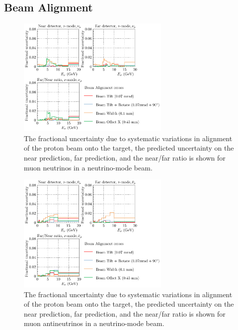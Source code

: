 \documentclass{article}
\begin{document}
\subsection{Beam Alignment}

\begin{figure}
  \centering
  \includegraphics[width=0.65\textwidth]{plots/fracerrs/numode_numu_BeamAlignment}
  \caption{The fractional uncertainty due to systematic variations in alignment of the proton beam onto the target, the predicted uncertainty on the near prediction, far prediction, and the near/far ratio is shown for muon neutrinos in a neutrino-mode beam. }
  \label{fig:beamalign_nu_numu}
\end{figure}

\begin{figure}
  \centering
  \includegraphics[width=0.65\textwidth]{plots/fracerrs/numode_numubar_BeamAlignment}
  \caption{The fractional uncertainty due to systematic variations in alignment of the proton beam onto the target, the predicted uncertainty on the near prediction, far prediction, and the near/far ratio is shown for muon antineutrinos in a neutrino-mode beam.}
  \label{fig:beamalign_nu_numubar}
\end{figure}
\end{document}
